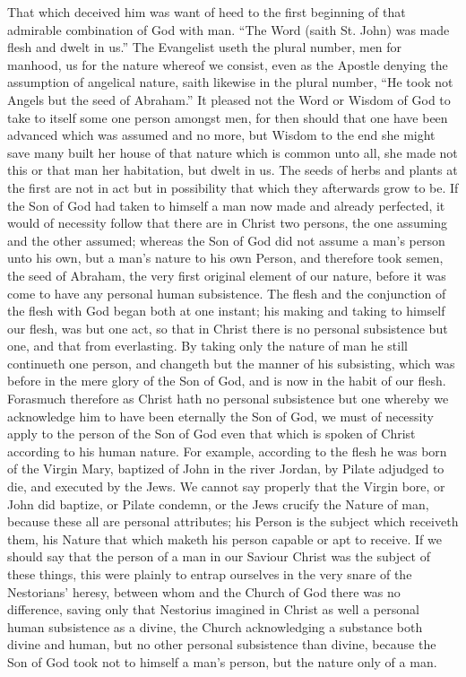 That which deceived him was want of heed to the first beginning of that admirable combination of God with man. “The Word (saith St. John) was made flesh and dwelt in us.” The Evangelist useth the plural number, men for manhood, us for the nature whereof we consist, even as the Apostle denying the assumption of angelical nature, saith likewise in the plural number, “He took not Angels but the seed of Abraham.” It pleased not the Word or Wisdom of God to take to itself some one person amongst men, for then should that one have been advanced which was assumed and no more, but Wisdom to the end she might save many built her house of that nature which is common unto all, she made not this or that man her habitation, but dwelt in us. The seeds of herbs and plants at the first are not in act but in possibility that which they afterwards grow to be. If the Son of God had taken to himself a man now made and already perfected, it would of necessity follow that there are in Christ two persons, the one assuming and the other assumed; whereas the Son of God did not assume a man’s person unto his own, but a man’s nature to his own Person, and therefore took semen, the seed of Abraham, the very first original element of our nature, before it was come to have any personal human subsistence. The flesh and the conjunction of the flesh with God began both at one  instant; his making and taking to himself our flesh, was but one act, so that in Christ there is no personal subsistence but one, and that from everlasting. By taking only the nature of man he still continueth one person, and changeth but the manner of his subsisting, which was before in the mere glory of the Son of God, and is now in the habit of our flesh.
Forasmuch therefore as Christ hath no personal subsistence but one whereby we acknowledge him to have been eternally the Son of God, we must of necessity apply to the person of the Son of God even that which is spoken of Christ according to his human nature. For example, according to the flesh he was born of the Virgin Mary, baptized of John in the river Jordan, by Pilate adjudged to die, and executed by the Jews. We cannot say properly that the Virgin bore, or John did baptize, or Pilate condemn, or the Jews crucify the Nature of man, because these all are personal attributes; his Person is the subject which receiveth them, his Nature that which maketh his person capable or apt to receive. If we should say that the person of a man in our Saviour Christ was the subject of these things, this were plainly to entrap ourselves in the very snare of the Nestorians’ heresy, between whom and the Church of God there was no difference, saving only that Nestorius imagined in Christ as well a personal human subsistence as a divine, the Church acknowledging a substance both divine and human, but no other personal subsistence than divine, because the Son of God took not to himself a man’s person, but the nature only of a man.
